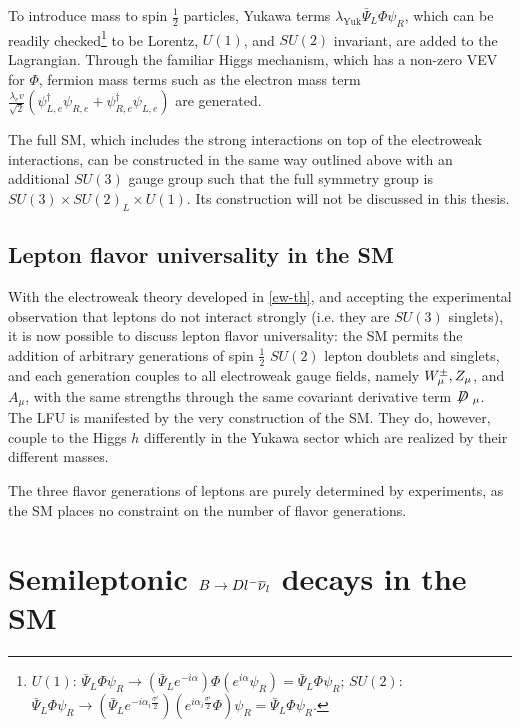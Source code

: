 To introduce mass to spin $\frac{1}{2}$ particles, Yukawa terms
$\lambda_\text{Yuk} \bar{\Psi}_L \Phi \psi_R$,
which can be readily checked\footnote{
    $U(1)$:
    $\bar{\Psi}_L \Phi \psi_R \rightarrow
    (\bar{\Psi}_L e^{-i \alpha}) \Phi (e^{i \alpha} \psi_R)
    = \bar{\Psi}_L \Phi \psi_R$;
    $SU(2)$:
    $\bar{\Psi}_L \Phi \psi_R \rightarrow
    (\bar{\Psi}_L e^{-i \alpha_i \frac{\sigma^i}{2}}) (e^{i \alpha_i \frac{\sigma^i}{2}} \Phi) \psi_R
    = \bar{\Psi}_L \Phi \psi_R$.
} to be Lorentz, $U(1)$, and $SU(2)$ invariant, are added to the Lagrangian.
Through the familiar Higgs mechanism, which has a non-zero VEV for $\Phi$,
fermion mass terms such as the electron mass term
$\frac{\lambda_e v}{\sqrt{2}}({\psi^\dagger_{L,e} \psi_{R,e} + \psi^\dagger_{R,e}\psi_{L,e}})$
are generated.

The full SM,
which includes the strong interactions on top of the electroweak interactions,
can be constructed in the same way outlined above with an additional $SU(3)$
gauge group such that the full symmetry group is
$SU(3) \times SU(2)_L \times U(1)$.
Its construction will not be discussed in this thesis.


\subsection{Lepton flavor universality in the SM}
\label{ref:theory:lfu}

With the electroweak theory developed in \cref{ew-th},
and accepting the experimental observation that leptons do not interact strongly
(i.e. they are $SU(3)$ singlets),
it is now possible to discuss lepton flavor universality:
the SM permits the addition of arbitrary generations of spin $\frac{1}{2}$
$SU(2)$ lepton doublets and singlets,
and each generation couples to all electroweak gauge fields,
namely ${W}^\pm_\mu, Z_\mu$, and $A_\mu$,
with the same strengths through the same covariant derivative term
$\fsl{D}_\mu$.
The LFU is manifested by the very construction of the SM.
They do, however, couple to the Higgs $h$ differently in the Yukawa sector which
are realized by their different masses.

The three flavor generations of leptons are purely determined by experiments,
as the SM places no constraint on the number of flavor generations.


\section{Semileptonic $B \rightarrow D {l^-}{{\overline{\nu}}_l}$ decays in the SM}

